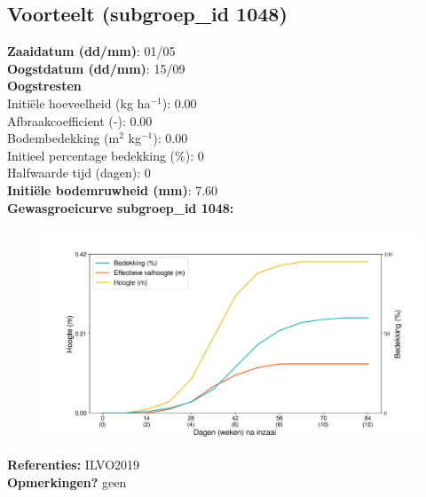 \documentclass{article}
\begin{document}
 \subsection{Voorteelt (subgroep\_id 1048)} 
  \textbf{Zaaidatum (dd/mm)}: 01/05  \vspace{0.10cm} \\ 
  \textbf{Oogstdatum (dd/mm)}: 15/09  \vspace{0.10cm} \\ 
  \textbf{Oogstresten} \vspace{0.05cm} \\ 
  \tab Initi\"{e}le hoeveelheid (kg ha$^{-1}$): 0.00 \vspace{0.05cm} \\ 
  \tab Afbraakcoefficient (-): 0.00 \vspace{0.05cm} \\ 
  \tab Bodembedekking (m$^2$ kg$^{-1}$): 0.00 \vspace{0.05cm} \\ 
  \tab Initieel percentage bedekking (\%): 0 \vspace{0.05cm} \\ 
  \tab Halfwaarde tijd (dagen): 0 \vspace{0.05cm} \\ 
  \textbf{Initi\"{e}le bodemruwheid (mm)}: 7.60 \vspace{0.05cm} \\ 
  \textbf{Gewasgroeicurve subgroep\_id 1048:} 
 \begin{center} \begin{figure}[H] \includegraphics[width=12.5cm]{temp/1048.png} \end{figure} \end{center} 
  \textbf{Referenties:} ILVO2019 \vspace{0.10cm} \\ 
  \textbf{Opmerkingen?} geen \vspace{0.10cm} \\ 
 \newpage 
\end{document}
